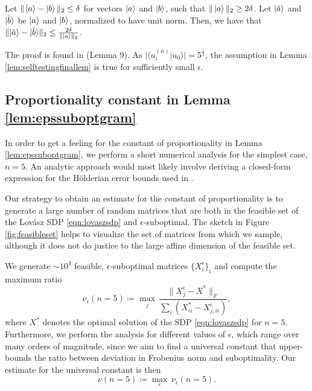 \begin{lemma}
\label{lem:selftestingfinallem}
Let $\| \ket{a} - \ket{b} \|_2\leq\delta$ for vectors $\ket{a}$ and $\ket{b}$, such that $\|\ket{a}\|_2\geq2\delta$. Let $\vert \Hat{a} \rangle$ and $\vert \Hat{b} \rangle$ be $\ket{a}$ and $\ket{b}$, normalized to have unit norm. Then, we have that $\| \vert \Hat{a}\rangle-\vert \Hat{b} \rangle \|_2\leq \frac{2\delta}{\|\ket{a}\|_2}$.
\end{lemma}
The proof is found in \cite{Bharti2019} (Lemma 9). As $\vert \langle u_i^{(n)}\vert u_0 \rangle \vert =5^{\frac{1}{4}}$, the assumption in Lemma \ref{lem:selftestingfinallem} is true for sufficiently small $\epsilon$.

\subsection{Proportionality constant in Lemma \ref{lem:epssuboptgram}}
\label{sec:propconst}

In order to get a feeling for the constant of proportionality in Lemma \ref{lem:epssuboptgram}, we perform a short numerical analysis for the simplest case, $n=5$. An analytic approach would most likely involve deriving a closed-form expression for the Hölderian error bounds used in \cite{Bharti2019}.

Our strategy to obtain an estimate for the constant of proportionality is to generate a large number of random matrices that are both in the feasible set of the Lovász SDP \ref{eqn:lovaszsdp} and $\epsilon$-suboptimal. The sketch in Figure \ref{fig:feasibleset} helps to visualize the set of matrices from which we sample, although it does not do justice to the large affine dimension of the feasible set. 


We generate $\sim 10^4$ feasible, $\epsilon$-suboptimal matrices $\{X_i^{\epsilon}\}_i$ and compute the maximum ratio 
\begin{equation*}
\nu_{\epsilon}(n=5)\coloneqq \max_j \, \frac{\|X_j^{\epsilon}-X^{*}\|_F}{\sum_i (X^{*}_{ii}-X_{j,ii}^{\epsilon})},
\end{equation*}
where $X^{*}$ denotes the optimal solution of the SDP \ref{eqn:lovaszsdp} for $n=5$.
Furthermore, we perform the analysis for different values of $\epsilon$, which range over many orders of magnitude, since we aim to find a universal constant that upper-bounds the ratio between deviation in Frobenius norm and suboptimality. Our estimate for the universal constant is then
\begin{equation*}
\nu(n=5)\coloneqq \max_{\epsilon}\, \nu_{\epsilon}(n=5).
\end{equation*}

